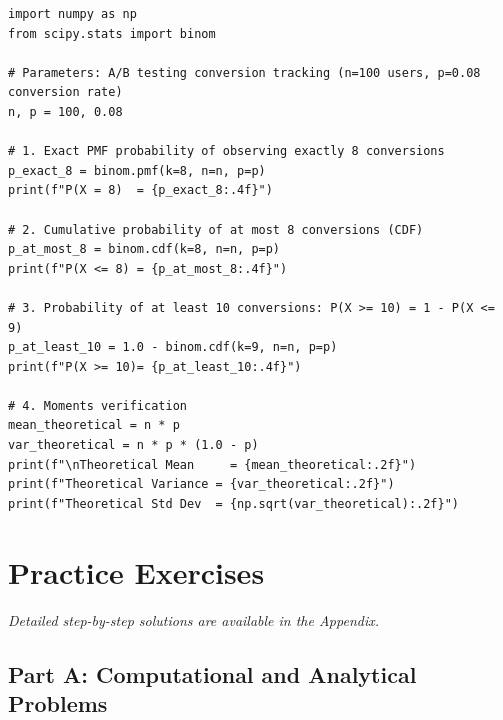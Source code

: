 \begin{lstlisting}[caption={Binomial Probability Calculations and Convergence in Python}]
import numpy as np
from scipy.stats import binom

# Parameters: A/B testing conversion tracking (n=100 users, p=0.08 conversion rate)
n, p = 100, 0.08

# 1. Exact PMF probability of observing exactly 8 conversions
p_exact_8 = binom.pmf(k=8, n=n, p=p)
print(f"P(X = 8)  = {p_exact_8:.4f}")

# 2. Cumulative probability of at most 8 conversions (CDF)
p_at_most_8 = binom.cdf(k=8, n=n, p=p)
print(f"P(X <= 8) = {p_at_most_8:.4f}")

# 3. Probability of at least 10 conversions: P(X >= 10) = 1 - P(X <= 9)
p_at_least_10 = 1.0 - binom.cdf(k=9, n=n, p=p)
print(f"P(X >= 10)= {p_at_least_10:.4f}")

# 4. Moments verification
mean_theoretical = n * p
var_theoretical = n * p * (1.0 - p)
print(f"\nTheoretical Mean     = {mean_theoretical:.2f}")
print(f"Theoretical Variance = {var_theoretical:.2f}")
print(f"Theoretical Std Dev  = {np.sqrt(var_theoretical):.2f}")
\end{lstlisting}

\newpage
\section{Practice Exercises}
\textit{Detailed step-by-step solutions are available in the Appendix.}

\subsection*{Part A: Computational and Analytical Problems}

